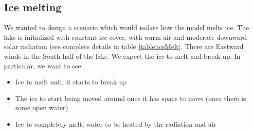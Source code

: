 \documentclass[11pt]{article}
\begin{document}
\subsection{Ice melting}
We wanted to design a scenario which would isolate how the model melts ice. The lake is initialized with constant ice cover, with warm air and moderate downward solar radiation (see complete details in table \ref{table:iceMelt}. There are Eastward winds in the South half of the lake. We expect the ice to melt and break up. In particular, we want to see:

\begin{itemize}
\item{Ice to melt until it starts to break up}
\item{The ice to start being moved around once it has space to move (once there is some open water)}
\item{Ice to completely melt, water to be heated by the radiation and air}
\end{itemize}
\end{document}
